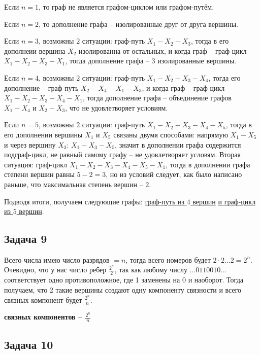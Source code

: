 \documentclass[a4paper,12pt]{article} %
\begin{document}
Если $n=1$, то граф не является графом-циклом или графом-путём.

Если $n=2$, то дополнение графа -- изолированные друг от друга вершины.

Если $n= 3$, возможны $2$ ситуации: граф-путь $X_1-X_2-X_3$, тогда в его дополнеии вершина $X_2$ изолированна от остальных, и когда граф -- граф-цикл $X_1-X_2-X_3-X_1$, тогда дополнение графа -- $3$ изолированные вершины.

Если $n= 4$, возможны $2$ ситуации: граф-путь $X_1-X_2-X_3-X_4$, тогда его дополнение -- граф-путь $X_2-X_4-X_1-X_3$, и когда граф -- граф-цикл $X_1-X_2-X_3-X_4-X_1$, тогда дополнение графа -- объединение графов $X_1-X_4$ и $X_2-X_3$, что не удовлетворяет условиям.

Если $n= 5$, возможны $2$ ситуации: граф-путь $X_1-X_2-X_3-X_4-X_5$, тогда в его дополнении вершины $X_1$ и $X_5$ связаны двумя способами: напрямую $X_1-X_5$ и через вершину $X_3$: $X_1-X_3-X_5$, значит в дополнении графа содержится подграф-цикл, не равный самому графу -- не удовлетворяет условям. Вторая ситуация: граф-цикл $X_1-X_2-X_3-X_4-X_5-X_1$, тогда в дополнении графа степени вершин равны $5-2=3$, но из условий следует, как было написано раньше, что максимальная степень вершин -- $2$.

Подводя итоги, получаем следующие графы: \underline{граф-путь из $4$ вершин}
\underline{и граф-цикл из $5$ вершин}.

\newpage
\begin{center}
\section*{Задача 9}
\end{center}

Всего числа имею число разрядов $ = n$, тогда всего номеров будет $2\cdot 2\dots 2 =2^n$. Очевидно, что у нас число ребер $\frac{2^n}{2}$, так как любому числу $\dots 0110010\dots $ соответствует одно противоположное, где 1 заменены на 0 и наоборот. Тогда получаем, что 2 такие вершины создают одну компоненту связности и всего связных компонент будет  $\frac{2^n}{n}$.


\begin{flushright}
\begin{large}
\textbf {связных компонентов -- $\frac{2^n}{n}$}
\end{large}
\end{flushright}


\newpage
\begin{center}
\section*{Задача 10}
\end{center}
\end{document}
